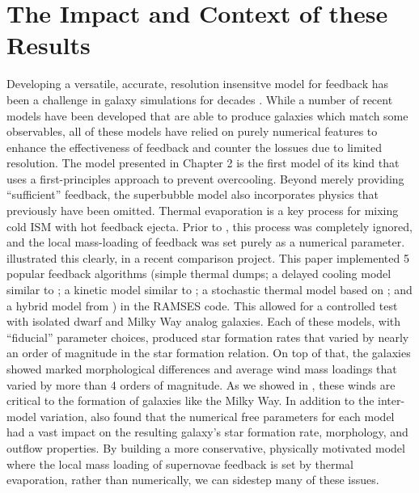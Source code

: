 \section{The Impact and Context of these Results}
Developing a versatile, accurate, resolution insensitve model for feedback has
been a challenge in galaxy simulations for decades \citep{Katz1992}.  While a
number of recent models have been developed that are able to produce galaxies
which match some observables, all of these models have relied on purely
numerical features to enhance the effectiveness of feedback and counter the
lossues due to limited resolution.  The \citet{Keller2014} model presented in Chapter 2 is
the first model of its kind that uses a first-principles approach to prevent
overcooling.  Beyond merely providing ``sufficient'' feedback, the superbubble model also
incorporates physics that previously have been omitted.  Thermal evaporation is
a key process for mixing cold ISM with hot feedback ejecta.  Prior to
\citet{Keller2014}, this process was completely ignored, and the local
mass-loading of feedback was set purely as a numerical parameter.
\citet{Rosdahl2016} illustrated this clearly, in a recent comparison project.
This paper implemented 5 popular feedback algorithms (simple thermal dumps; a
delayed cooling model similar to \citet{Agertz2013}; a kinetic model similar to
\citet{DallaVecchia2008}; a stochastic thermal model based on
\citet{DallaVecchia2012}; and a hybrid model from \citet{Kimm2015}) in the {\sc
RAMSES} code.  This allowed for a controlled test with isolated dwarf and Milky
Way analog galaxies. Each of these models, with ``fiducial'' parameter choices,
produced star formation rates that varied by nearly an order of magnitude in the
\citet{Kennicutt1998} star formation relation.  On top of that, the galaxies
showed marked morphological differences and average wind mass loadings that
varied by more than 4 orders of magnitude.  As we showed in \citet{Keller2015},
these winds are critical to the formation of galaxies like the Milky Way.  
In addition to the inter-model variation, \citet{Rosdahl2016} also found that the
numerical free parameters for each model had a vast impact on the resulting
galaxy's star formation rate, morphology, and outflow properties.  By building a
more conservative, physically motivated model where the local mass loading of
supernovae feedback is set by thermal evaporation, rather than numerically, we
can sidestep many of these issues.

